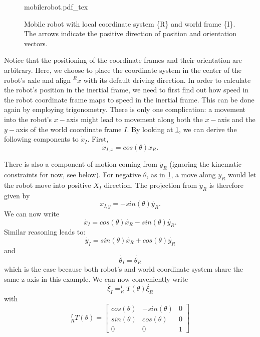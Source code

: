 \begin{figure}[htb!]
    \centering
    \def\svgwidth{0.85\textwidth}
    {mobilerobot.pdf_tex}
    \caption{Mobile robot with local coordinate system \{R\} and world frame \{I\}. The arrows indicate the positive direction of position and orientation vectors.
    }
    \label{fig:mobilerobot}
\end{figure}



Notice that the positioning of the coordinate frames and their orientation are arbitrary. Here, we choose to place the coordinate system in the center of the robot's axle and align $^Rx$ with its default driving direction.
In order to calculate the robot's position in the inertial frame, we need to first find out how speed in the robot coordinate frame maps to speed in the inertial frame.
This can be done again by employing trigonometry. There is only one complication: a movement into the robot's $x-$axis might lead to movement along both the $x-$axis and the $y-$axis of the world coordinate frame ${I}$. By looking at \cref{fig:mobilerobot}, we can derive the following components to $\dot{x}_I$. First,
\begin{equation}
\dot{x}_{I,x}=cos(\theta) \dot{x}_R.
\end{equation}

There is also a component of motion coming from $ \dot{y}_R$ (ignoring the kinematic constraints for now, see below).  For negative $ \theta$, as in \cref{fig:mobilerobot}, a move along $y_R$ would let the robot move into positive $ X_I$ direction. The projection from $ \dot{y}_R$ is therefore given by
\begin{equation}
\dot{x_{I,y}}=-sin(\theta)\dot{y_R}.
\end{equation}
We can now write
\begin{equation}
\dot{x_I}=cos(\theta) \dot{x_R} - sin(\theta) \dot{y_R}.
\end{equation}
Similar reasoning leads to:
\begin{equation}
\dot{y_I}=sin(\theta) \dot{x_R} + cos(\theta) \dot{y_R}
\end{equation}
and
\begin{equation}
\dot{\theta_I}=\dot{\theta_R}
\end{equation}
which is the case because both robot's and world coordinate system share the same z-axis in this example. We can now conveniently write
\begin{equation}
\dot{\xi_I}=^I_RT(\theta)\dot{\xi_R}
\end{equation}
with
\begin{equation}
^I_RT(\theta)=\left[\begin{array}{ccc}
cos(\theta) & -sin(\theta) & 0 \\
sin(\theta) & cos(\theta) & 0 \\
0 & 0 & 1\end{array}\right]
\end{equation}


